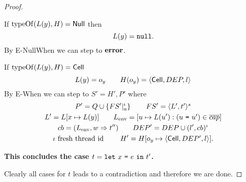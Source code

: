 \begin{proof}
\begin{description}
\begin{description}
          If $\mbox{$\mathrm{typeOf}$}(L(y), H) = \mbox{$\mathsf{Null}$}$ then
          \begin{equation*}
            L(y) = \mbox{\mdseries\texttt{null}}.
          \end{equation*}
          By {\sc E-NullWhen} we can step to $\mbox{{\bf error}}$. \contradiction

          If $\mbox{$\mathrm{typeOf}$}(L(y), H) = \mbox{$\mathsf{Cell}$}$
          \begin{equation*}
            L(y) = o_y  \quad\quad H(o_y) = \mbox{$\langle \mbox{$\mathsf{Cell}$}{}, DEP, l \rangle$}
          \end{equation*}
          By {\sc E-When} we can step to $S' = H', P'$ where
          \begin{equation*}
            \begin{gathered}
              P' = Q \cup \left\{FS'|_a^\iota \right\} \quad\quad FS' = \mbox{$\langle L',
              t' \rangle^s$} \\
              L' = L[x \mapsto L(y)] \quad\quad L_{\text{env}} = [u \mapsto L(u'):
              (\mbox{\mdseries$u$~\texttt{=}~$u'$}) \in \overline{cap}] \\
              cb = ( L_{\text{env}}, w \Rightarrow t'' ) \quad\quad DEP' = DEP
              \cup (l', cb)^\iota \\
              \iota \text{ fresh thread id } \quad\quad H' = H[o_y \mapsto \mbox{$\langle \mbox{$\mathsf{Cell}$}{}, DEP',
              l \rangle$}].
            \end{gathered}
          \end{equation*}
          \contradiction
      \end{description}
      {\bf This concludes the case $t = \mbox{\mdseries\texttt{let}~$x$~\texttt{=}~$e$~\texttt{in}~$t'$}$.}
  \end{description}
  Clearly all cases for $t$ leads to a contradiction and therefore we are done.
\end{proof}








